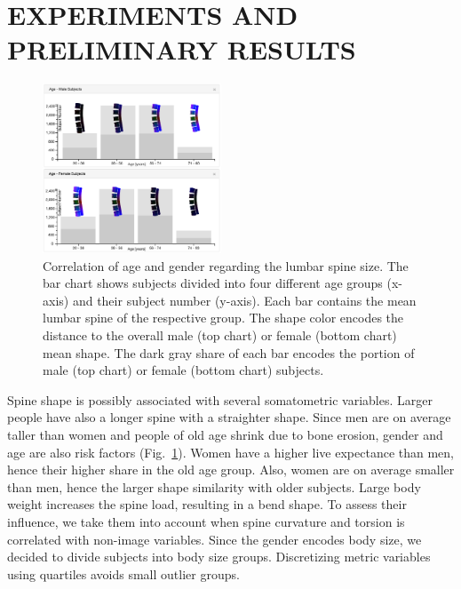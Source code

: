 \documentclass[a4paper,twoside]{style/article}
\begin{document}
\section{\uppercase{Experiments and Preliminary Results}}
\label{sec:Experiments}
\begin{figure}[!h]
  \centering
  \includegraphics[width=0.475\textwidth]{figures/age-gender}
  \caption{
	Correlation of age and gender regarding the lumbar spine size.
	The bar chart shows subjects divided into four different age groups (x-axis) and their subject number (y-axis).
	Each bar contains the mean lumbar spine of the respective group.
	The shape color encodes the distance to the overall male (top chart) or female (bottom chart) mean shape.
	The dark gray share of each bar encodes the portion of male (top chart) or female (bottom chart) subjects.
	}
  \label{fig:age-gender}
\end{figure}
\noindent Spine shape is possibly associated with several somatometric variables.
Larger people have also a longer spine with a straighter shape.
Since men are on average taller than women and people of old age shrink due to bone erosion, gender and age are also risk factors (Fig.~\ref{fig:age-gender}).
Women have a higher live expectance than men, hence their higher share in the old age group.
Also, women are on average smaller than men, hence the larger shape similarity with older subjects.
Large body weight increases the spine load, resulting in a bend shape.
To assess their influence, we take them into account when spine curvature and torsion is correlated with non-image variables.
Since the gender encodes body size, we decided to divide subjects into body size groups.
Discretizing metric variables using quartiles avoids small outlier groups.
\end{document}
